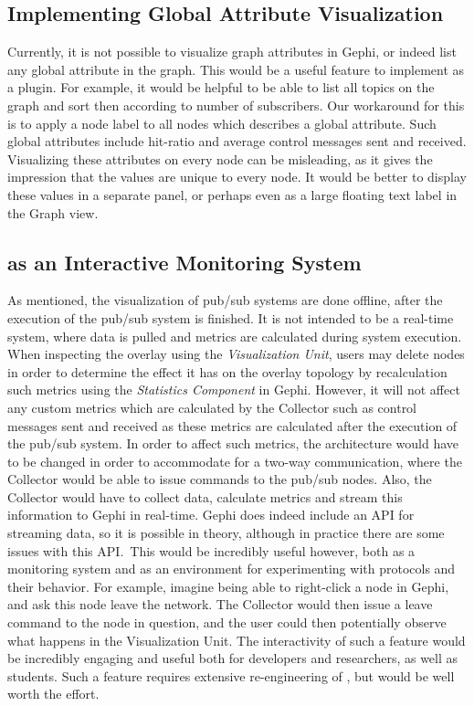 \subsection{Implementing Global Attribute Visualization}

Currently, it is not possible to visualize graph attributes in Gephi, or
indeed list any global attribute in the graph. This would be a useful
feature to implement as a plugin. For example, it would be helpful to be
able to list all topics on the graph and sort then according to number
of subscribers. Our workaround for this is to apply a node label to all
nodes which describes a global attribute. Such global attributes include
hit-ratio and average control messages sent and received. Visualizing
these attributes on every node can be misleading, as it gives the
impression that the values are unique to every node. It would be better
to display these values in a separate panel, or perhaps even as a large
floating text label in the Graph view.

\subsection{\demo{} as an Interactive Monitoring System}

As mentioned, the visualization of pub/sub systems are done offline,
after the execution of the pub/sub system is finished. It is not
intended to be a real-time system, where data is pulled and metrics are
calculated during system execution. When inspecting the overlay using
the \emph{Visualization Unit}, users may delete nodes in order to
determine the effect it has on the overlay topology by recalculation
such metrics using the \emph{Statistics Component} in Gephi. However, it will
not affect any custom metrics which are calculated by the Collector such
as control messages sent and received as these metrics are calculated
after the execution of the pub/sub system. In order to affect such
metrics, the architecture would have to be changed in order to
accommodate for a two-way communication, where the Collector would be
able to issue commands to the pub/sub nodes. Also, the Collector would
have to collect data, calculate metrics and stream this information to
Gephi in real-time. Gephi does indeed include an API for streaming data,
so it is possible in theory, although in practice there are some issues
with this API.\ This would be incredibly useful however, both as a
monitoring system and as an environment for experimenting with protocols
and their behavior. For example, imagine being able to right-click a
node in Gephi, and ask this node leave the network. The Collector would
then issue a leave command to the node in question, and the user could
then potentially observe what happens in the Visualization Unit. The
interactivity of such a feature would be incredibly engaging and useful
both for developers and researchers, as well as students. Such
a feature requires extensive re-engineering of \demo{}, but would be
well worth the effort.

